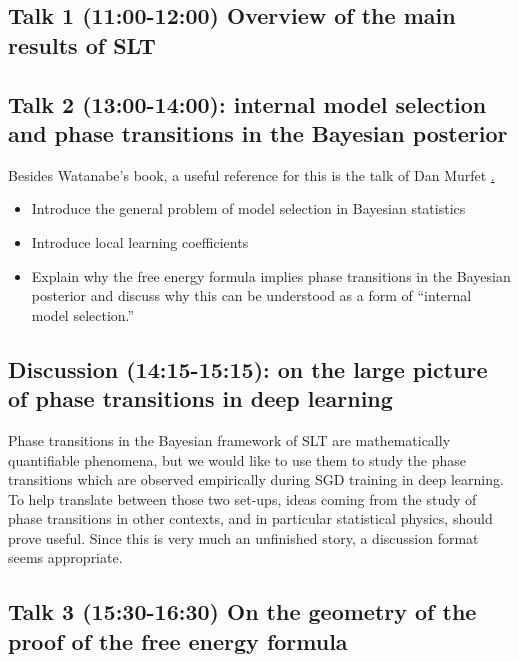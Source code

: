 \documentclass[a4paper,11pt]{amsart}
\begin{document}
\subsection*{Talk 1 (11:00-12:00) Overview of the main results of SLT}

\subsection*{Talk 2 (13:00-14:00): internal model selection and phase transitions in the Bayesian posterior}

Besides Watanabe's book, a useful reference for this is the talk of Dan Murfet \href{https://www.youtube.com/watch?v=UBY7xc1LZ6E&t=4364s}.

\begin{itemize}
\item Introduce the general problem of model selection in Bayesian statistics \cite[\S 8.1]{green-book}
\item Introduce local learning coefficients \cite{lambdahat}
\item Explain why the free energy formula implies phase transitions in the Bayesian posterior and discuss why this can be understood as a form of ``internal model selection.''\cite[\S 7.6]{grey-book} \cite[\S 9.4]{green-book}

\end{itemize}

\subsection*{Discussion (14:15-15:15): on the large picture of phase transitions in deep learning}

Phase transitions in the Bayesian framework of SLT are mathematically quantifiable phenomena, but we would like to use them to study the phase transitions which are observed empirically during SGD training in deep learning. To help translate between those two set-ups, ideas coming from the study of phase transitions in other contexts, and in particular statistical physics, should prove useful. Since this is very much an unfinished story, a discussion format seems appropriate.

\subsection*{Talk 3 (15:30-16:30) On the geometry of the proof of the free energy formula}
\end{document}
